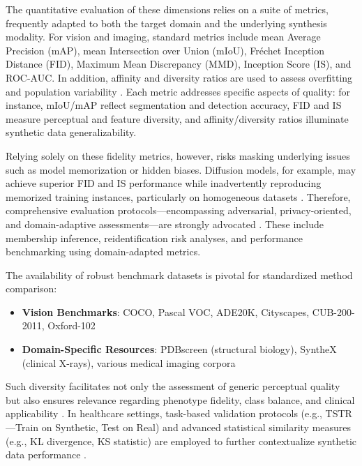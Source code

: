 \documentclass[sigconf]{acmart}
\begin{document}
The quantitative evaluation of these dimensions relies on a suite of metrics, frequently adapted to both the target domain and the underlying synthesis modality. For vision and imaging, standard metrics include mean Average Precision (mAP), mean Intersection over Union (mIoU), Fréchet Inception Distance (FID), Maximum Mean Discrepancy (MMD), Inception Score (IS), and ROC-AUC. In addition, affinity and diversity ratios are used to assess overfitting and population variability \cite{ref1}\cite{ref2}\cite{ref3}\cite{ref12}\cite{ref14}\cite{ref15}\cite{ref18}\cite{ref21}\cite{ref22}\cite{ref24}\cite{ref31}\cite{ref34}\cite{ref43}\cite{ref60}\cite{ref64}\cite{ref68}\cite{ref88}\cite{ref90}\cite{ref93}\cite{ref95}\cite{ref101}\cite{ref102}. Each metric addresses specific aspects of quality: for instance, mIoU/mAP reflect segmentation and detection accuracy, FID and IS measure perceptual and feature diversity, and affinity/diversity ratios illuminate synthetic data generalizability.

Relying solely on these fidelity metrics, however, risks masking underlying issues such as model memorization or hidden biases. Diffusion models, for example, may achieve superior FID and IS performance while inadvertently reproducing memorized training instances, particularly on homogeneous datasets \cite{ref87}\cite{ref95}. Therefore, comprehensive evaluation protocols—encompassing adversarial, privacy-oriented, and domain-adaptive assessments—are strongly advocated \cite{ref87}\cite{ref88}\cite{ref89}. These include membership inference, reidentification risk analyses, and performance benchmarking using domain-adapted metrics.

The availability of robust benchmark datasets is pivotal for standardized method comparison:

\begin{itemize}
    \item \textbf{Vision Benchmarks}: COCO, Pascal VOC, ADE20K, Cityscapes, CUB-200-2011, Oxford-102
    \item \textbf{Domain-Specific Resources}: PDBscreen (structural biology), SyntheX (clinical X-rays), various medical imaging corpora
\end{itemize}

Such diversity facilitates not only the assessment of generic perceptual quality but also ensures relevance regarding phenotype fidelity, class balance, and clinical applicability \cite{ref31}\cite{ref34}\cite{ref43}\cite{ref79}\cite{ref81}. In healthcare settings, task-based validation protocols (e.g., TSTR—Train on Synthetic, Test on Real) and advanced statistical similarity measures (e.g., KL divergence, KS statistic) are employed to further contextualize synthetic data performance \cite{ref87}\cite{ref88}\cite{ref89}.
\end{document}

